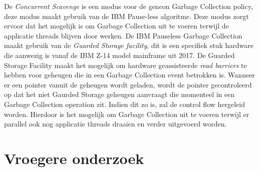 De \textit{Concurrent Scavenge} is een modus voor de gencon Garbage Collection policy, deze modus maakt gebruik van de IBM Pause-less algoritme. Deze modus zorgt ervoor dat het mogelijk is om Garbage Collection uit te voeren terwijl de  applicatie threads blijven door werken.
De IBM Pauseless Garbage Collection maakt gebruik van de \textit{Guarded Storage facility}, dit is een specifiek stuk hardware die aanwezig is vanaf de IBM Z-14 model mainframe uit 2017.
De Guarded Storage Facility maakt het mogelijk om hardware geassisteerde \textit{read barriers} te hebben voor geheugen die in een Garbage Collection event betrokken is. %
Wanneer er een pointer vanuit de geheugen wordt geladen, wordt de pointer gecontroleerd op dat het niet Gaurded Storage geheugen aanvraagt die momenteel in een Garbage Collection operation zit.
Indien dit zo is, zal de control flow hergeleid worden. %
Hierdoor is het mogelijk om Garbage Collection uit te voeren terwijl er parallel ook nog applicatie threads draaien en verder uitgevoerd worden.



\section{Vroegere onderzoek}
\label{sec:vroegereonderzoek}